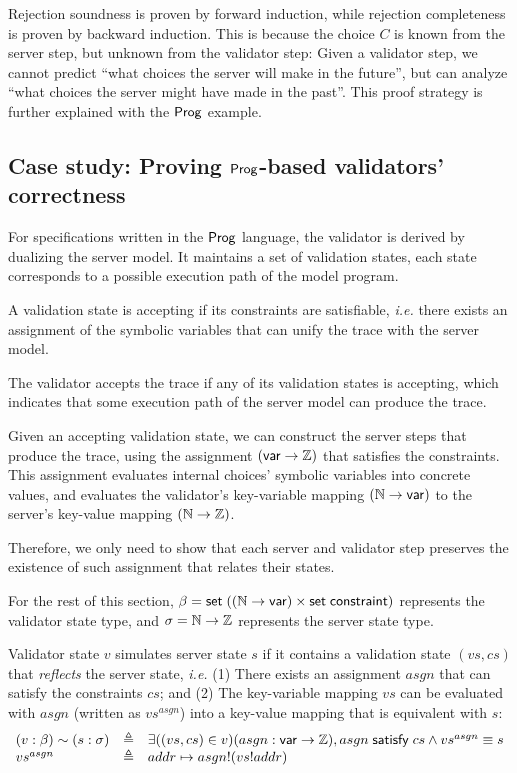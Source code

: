 Rejection soundness is proven by forward induction, while rejection completeness
is proven by backward induction.  This is because the choice $C$ is known from
the server step, but unknown from the validator step: Given a validator step, we
cannot predict ``what choices the server will make in the future'', but can
analyze ``what choices the server might have made in the past''.  This proof
strategy is further explained with the $\mathsf{Prog}$ example.

\subsection{Case study: Proving $\mathsf{Prog}$-based validators' correctness}
For specifications written in the $\mathsf{Prog}$ language, the validator is derived by
dualizing the server model.  It maintains a set of validation states, each state
corresponds to a possible execution path of the model program.

A validation state is accepting if its constraints are satisfiable, {\it i.e.}
there exists an assignment of the symbolic variables that can unify the trace
with the server model.

The validator accepts the trace if any of its validation states is accepting,
which indicates that some execution path of the server model can produce the
trace.

Given an accepting validation state, we can construct the server steps that
produce the trace, using the assignment $(\mathsf{var}\to\mathbb Z)$ that satisfies the
constraints.  This assignment evaluates internal choices' symbolic variables
into concrete values, and evaluates the validator's key-variable mapping
$(\mathbb N\to\mathsf{var})$ to the server's key-value mapping $(\mathbb N\to\mathbb Z)$.

Therefore, we only need to show that each server and validator step preserves
the existence of such assignment that relates their states.

For the rest of this section, $\beta=\mathsf{set}\;((\mathbb N\to\mathsf{var})\times\mathsf{set}\;\mathsf{constraint})$
represents the validator state type, and $\sigma=\mathbb N\to\mathbb Z$ represents the
server state type.

\begin{definition}
  Validator state $v$ simulates server state $s$ if it contains a validation
  state $(vs,cs)$ that {\em reflects} the server state, {\it i.e.}  (1) There
  exists an assignment $asgn$ that can satisfy the constraints $cs$; and (2) The
  key-variable mapping $vs$ can be evaluated with $asgn$ (written as
  $vs^{asgn}$) into a key-value mapping that is equivalent with
  $s$: \[\begin{array}{lll} (v:\beta)\sim (s:\sigma)&\triangleq& \exists((vs,cs)\in
  v)(asgn:\mathsf{var}\to\mathbb Z),asgn\;\mathsf{satisfy}\;cs\wedge vs^{asgn}\equiv s\\
  vs^{asgn}&\triangleq&addr\mapsto asgn!(vs!addr) \end{array}\]
\end{definition}

